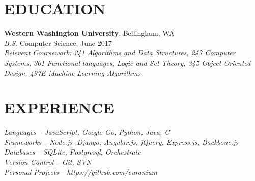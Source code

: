 \documentclass[line,margin]{res}
\begin{document}
\address{360.931.3237 $|$ rainierharvey@gmail.com $|$ https://rainierharvey.me $|$ github.com/euranium}

\begin{resume}

\section{EDUCATION}
	{\bf Western Washington University}, Bellingham, WA \\
	{\sl B.S.} Computer Science, {\small June 2017} \\
	{\sl Relevent Coursework: 241 {\small Algorithms and Data Structures}, 247 {\small Computer Systems},
	301 {\small Functional languages, Logic and Set Theory}, 345 {\small Object Oriented Design}, 497E {\small Machine Learning Algorithms}}
\section{EXPERIENCE}

	{\sl Languages} -- {\sl JavaScript, Google Go, Python, Java, C}\\
	{\sl Frameworks} -- {\sl Node.js ,Django, Angular.js, jQuery, Express.js, Backbone.js} \\
	{\sl Databases} -- {\sl SQLite, Postgresql, Orchestrate} \\
	{\sl Version Control} -- {\sl Git, SVN}\\
	{\sl Personal Projects} -- {\sl https://github.com/euranium}\\


\end{resume}
\end{document}
